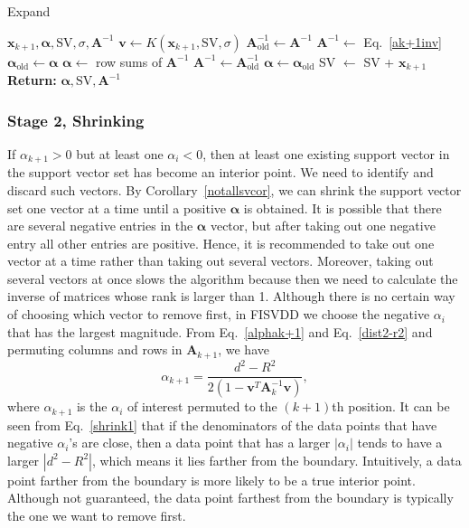 \documentclass{article}
\newcommand{\eref}[1]{Eq.~\ref{#1}}
\newcommand{\cref}[1]{Corollary~\ref{#1}}
\numberwithin{equation}{section}
\begin{document}
\begin{algorithm}
   \centering
   \caption{Expand}\label{expand}
\begin{algorithmic}[1]
    {$\mathbf{x}_{k+1},\boldsymbol{\alpha},\mathrm{SV},\sigma,\mathbf{A}^{-1}$}
   \STATE $\mathbf{v} \gets K(\mathbf{x}_{k+1},\mathrm{SV},\sigma)$    
   \STATE $\mathbf{A}_{\mathrm{old}}^{-1}\gets\mathbf{A}^{-1}$
   \STATE $\mathbf{A}^{-1}\gets$ \eref{ak+1inv} 
   \STATE $\boldsymbol{\alpha}_{\mathrm{old}} \gets \boldsymbol{\alpha}$
   \STATE $\boldsymbol{\alpha}\gets$ row sums of $\mathbf{A}^{-1}$
   		\STATE $\mathbf{A}^{-1}\gets\mathbf{A}_{\mathrm{old}}^{-1}$
   		\STATE $\boldsymbol{\alpha}\gets\boldsymbol{\alpha}_{\mathrm{old}}$
   \ELSE
   		\STATE SV $\gets$ SV + $\mathbf{x}_{k+1}$
   \ENDIF
\STATE \textbf{Return:} {$\boldsymbol{\alpha},\mathrm{SV},\mathbf{A}^{-1}$}
\end{algorithmic}
\end{algorithm}



\subsubsection{Stage 2, Shrinking}
If $\alpha_{k+1}>0$ but at least one $\alpha_i<0$, then at least one existing support vector in the support vector set has become an interior point. We need to identify and discard such vectors. By \cref{notallsvcor}, we can shrink the support vector set one vector at a time until a positive $\boldsymbol{\alpha}$ is obtained. It is possible that there are several negative entries in the $\boldsymbol{\alpha}$ vector, but after taking out one negative entry all other entries are positive. Hence, it is recommended to take out one vector at a time rather than taking out several vectors. Moreover, taking out several vectors at once slows the algorithm because then we need to calculate the inverse of matrices whose rank is larger than 1. Although there is no certain way of choosing which vector to remove first, in FISVDD we choose the negative $\alpha_i$ that has the largest magnitude. From \eref{alphak+1} and \eref{dist2-r2} and permuting columns and rows in $\mathbf{A}_{k+1}$, we have
\begin{equation}\label{shrink1}
\alpha_{k+1} = \frac{d^2-R^2}{2(1-\mathbf{v}^T\mathbf{A}_k^{-1}\mathbf{v})},
\end{equation}
where $\alpha_{k+1}$ is the $\alpha_i$ of interest permuted to the $(k+1)$th position. It can be seen from \eref{shrink1} that if the denominators of the data points that have negative $\alpha_i$'s are close, then a data point that has a larger $|\alpha_i|$ tends to have a larger $|d^2-R^2|$, which means it lies farther from the boundary. Intuitively, a data point farther from the boundary is more likely to be a true interior point. Although not guaranteed, the data point farthest from the boundary is typically the one we want to remove first.
\end{document}
